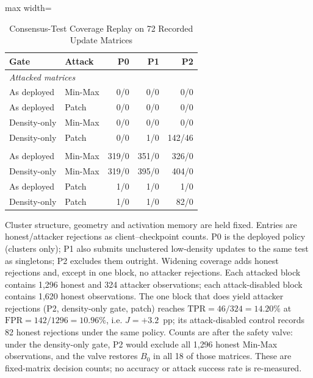 \begin{table}[!t]
\centering\footnotesize
\setlength{\tabcolsep}{4pt}
\caption{Consensus-Test Coverage Replay on 72 Recorded Update Matrices}\label{tab:coverage_replay}
\begin{adjustbox}{max width=\columnwidth}
\begin{tabular}{llrrr}
\toprule
Gate & Attack & P0 & P1 & P2 \\
\midrule
\multicolumn{5}{l}{\emph{Attacked matrices}} \\
\quad As deployed & Min-Max & 0/0 & 0/0 & 0/0 \\
\quad As deployed & Patch & 0/0 & 0/0 & 0/0 \\
\quad Density-only & Min-Max & 0/0 & 0/0 & 0/0 \\
\quad Density-only & Patch & 0/0 & 1/0 & 142/46 \\
\addlinespace[3pt]
\multicolumn{5}{l}{\emph{Attack-disabled controls}} \\
\quad As deployed & Min-Max & 319/0 & 351/0 & 326/0 \\
\quad Density-only & Min-Max & 319/0 & 395/0 & 404/0 \\
\quad As deployed & Patch & 1/0 & 1/0 & 1/0 \\
\quad Density-only & Patch & 1/0 & 1/0 & 82/0 \\
\bottomrule
\end{tabular}
\end{adjustbox}

\par\vspace{3pt}\parbox{\linewidth}{\footnotesize Cluster structure, geometry and activation memory are held fixed. Entries are honest/attacker rejections as client--checkpoint counts. P0 is the deployed policy (clusters only); P1 also submits unclustered low-density updates to the same test as singletons; P2 excludes them outright. Widening coverage adds honest rejections and, except in one block, no attacker rejections. Each attacked block contains 1{,}296 honest and 324 attacker observations; each attack-disabled block contains 1{,}620 honest observations. The one block that does yield attacker rejections (P2, density-only gate, patch) reaches $\mathrm{TPR}=46/324=14.20\%$ at $\mathrm{FPR}=142/1296=10.96\%$, i.e. $J=+3.2$~pp; its attack-disabled control records 82 honest rejections under the same policy. Counts are after the safety valve: under the density-only gate, P2 would exclude all 1{,}296 honest Min-Max observations, and the valve restores $B_0$ in all 18 of those matrices. These are fixed-matrix decision counts; no accuracy or attack success rate is re-measured.}
\end{table}
